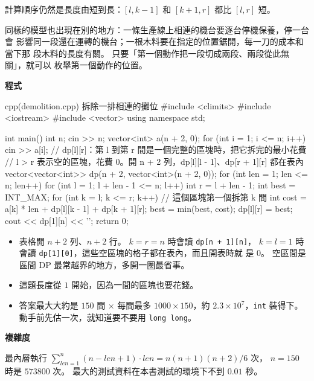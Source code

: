 計算順序仍然是長度由短到長：$[l, k - 1]$ 和 $[k + 1, r]$ 都比 $[l, r]$ 短。

同樣的模型也出現在別的地方：一條生產線上相連的機台要逐台停機保養，停一台會
影響同一段還在運轉的機台；一根木料要在指定的位置鋸開，每一刀的成本和當下那
段木料的長度有關。 只要「第一個動作把一段切成兩段、兩段從此無關」，就可以
枚舉第一個動作的位置。

\textbf{程式}

\begin{example}[label=ex:ivdp-demolish]{cpp}{(demolition.cpp) 拆除一排相連的攤位}
#include <climits>
#include <iostream>
#include <vector>
using namespace std;

int main() {
    int n;
    cin >> n;
    vector<int> a(n + 2, 0);
    for (int i = 1; i <= n; i++) {
        cin >> a[i];
    }
    // dp[l][r]：第 l 到第 r 間是一個完整的區塊時，把它拆完的最小花費
    // l > r 表示空的區塊，花費 0。開 n + 2 列，dp[l][l - 1]、dp[r + 1][r] 都在表內
    vector<vector<int>> dp(n + 2, vector<int>(n + 2, 0));
    for (int len = 1; len <= n; len++) {
        for (int l = 1; l + len - 1 <= n; l++) {
            int r = l + len - 1;
            int best = INT_MAX;
            for (int k = l; k <= r; k++) {    // 這個區塊第一個拆第 k 間
                int cost = a[k] * len + dp[l][k - 1] + dp[k + 1][r];
                best = min(best, cost);
            }
            dp[l][r] = best;
        }
    }
    cout << dp[1][n] << '\n';
    return 0;
}
\end{example}


\begin{itemize}
\item 表格開 $n + 2$ 列、$n + 2$ 行。 $k = r = n$ 時會讀 \texttt{dp[n + 1][n]}，
$k = l = 1$ 時會讀 \texttt{dp[1][0]}，這些空區塊的格子都在表內，而且開表時就
是 $0$。 空區間是區間 DP 最常越界的地方，多開一圈最省事。
\item 這題長度從 $1$ 開始，因為一間的區塊也要花錢。
\item 答案最大大約是 $150$ 間 $\times$ 每間最多 $1000 \times 150$，約
$2.3 \times 10^7$，\texttt{int} 裝得下。 動手前先估一次，就知道要不要用
\texttt{long long}。
\end{itemize}

\textbf{複雜度}

最內層執行 $\sum_{len=1}^{n} (n - len + 1) \cdot len = n(n + 1)(n + 2)/6$ 次，
$n = 150$ 時是 $573800$ 次。 最大的測試資料在本書測試的環境下不到 $0.01$ 秒。

